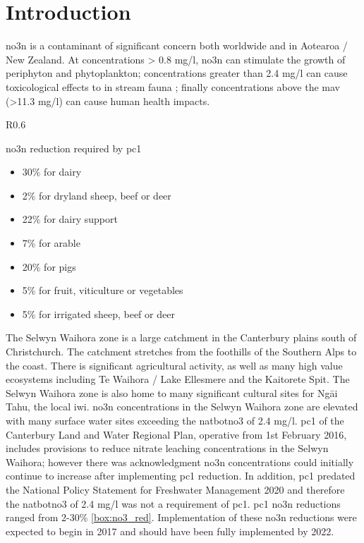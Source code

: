 
\section[Introduction]{Introduction} \label{sec:intro}

\gls{no3n} is a contaminant of significant concern both worldwide and in Aotearoa / New Zealand.
At concentrations > 0.8 mg/l, \gls{no3n} can stimulate the growth of periphyton and phytoplankton\citep{mcdowell_global_2020}; concentrations greater than 2.4 mg/l can cause toxicological effects to in stream fauna
\citep{camargo_nitrate_2005, horak_assessing_2019,wagenhoff_identifying_2017};
finally concentrations above the \gls{mav} (>11.3 mg/l) can cause human health impacts\citep{rahman_anthropogenic_2021}.

\begin{wrapfigure}{R}{0.6\textwidth}
    \begin{breakawaybox}[label={box:no3_red}]{\gls{no3n} reduction required by \gls{pc1}}
        \begin{itemize}
            \item 30\% for dairy
            \item 2\% for dryland sheep, beef or deer
            \item 22\% for dairy support
            \item 7\% for arable
            \item 20\% for pigs
            \item 5\% for fruit, viticulture or vegetables
            \item 5\% for irrigated sheep, beef or deer
        \end{itemize}
    \end{breakawaybox}
\end{wrapfigure}

The Selwyn Waihora zone is a large catchment in the Canterbury plains south of Christchurch.
The catchment stretches from the foothills of the Southern Alps to the coast.
There is significant agricultural activity, as well as many high value ecosystems including Te Waihora / Lake Ellesmere and the Kaitorete Spit.
The Selwyn Waihora zone is also home to many significant cultural sites for Ngāi Tahu, the local iwi.
\gls{no3n} concentrations in the Selwyn Waihora zone are elevated with many surface water sites exceeding the \gls{natbotno3} of 2.4 mg/l\citep{noauthor_national_2020}.
\gls{pc1} of the Canterbury Land and Water Regional Plan, operative from 1st February 2016, includes provisions to reduce nitrate leaching concentrations in the Selwyn Waihora; however there was acknowledgment \gls{no3n} concentrations could initially continue to increase after implementing \gls{pc1} reduction.
In addition, \gls{pc1} predated the National Policy Statement for Freshwater Management 2020 and therefore the \gls{natbotno3} of 2.4 mg/l was not a requirement of \gls{pc1}.
\gls{pc1} \gls{no3n} reductions ranged from 2-30\% \autoref{box:no3_red}.
Implementation of these \gls{no3n} reductions were expected to begin in 2017 and should have been fully implemented by 2022.


